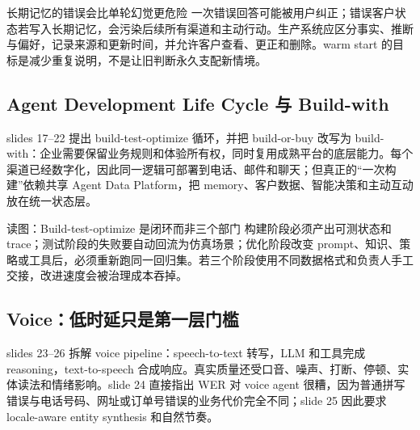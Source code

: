 \begin{warningbox}{长期记忆的错误会比单轮幻觉更危险}
一次错误回答可能被用户纠正；错误客户状态若写入长期记忆，会污染后续所有渠道和主动行动。生产系统应区分事实、推断与偏好，记录来源和更新时间，并允许客户查看、更正和删除。warm start 的目标是减少重复说明，不是让旧判断永久支配新情境。
\end{warningbox}

\subsection{Agent Development Life Cycle 与 Build-with}

slides 17--22 提出 build-test-optimize 循环，并把 build-or-buy 改写为 build-with：企业需要保留业务规则和体验所有权，同时复用成熟平台的底层能力。每个渠道已经数字化，因此同一逻辑可部署到电话、邮件和聊天；但真正的“一次构建”依赖共享 Agent Data Platform，把 memory、客户数据、智能决策和主动互动放在统一状态层。


\begin{knowledgebox}{读图：Build-test-optimize 是闭环而非三个部门}
构建阶段必须产出可测状态和 trace；测试阶段的失败要自动回流为仿真场景；优化阶段改变 prompt、知识、策略或工具后，必须重新跑同一回归集。若三个阶段使用不同数据格式和负责人手工交接，改进速度会被治理成本吞掉。
\end{knowledgebox}

\subsection{Voice：低时延只是第一层门槛}

slides 23--26 拆解 voice pipeline：speech-to-text 转写，LLM 和工具完成 reasoning，text-to-speech 合成响应。真实质量还受口音、噪声、打断、停顿、实体读法和情绪影响。slide 24 直接指出 WER 对 voice agent 很糟，因为普通拼写错误与电话号码、网址或订单号错误的业务代价完全不同；slide 25 因此要求 locale-aware entity synthesis 和自然节奏。

